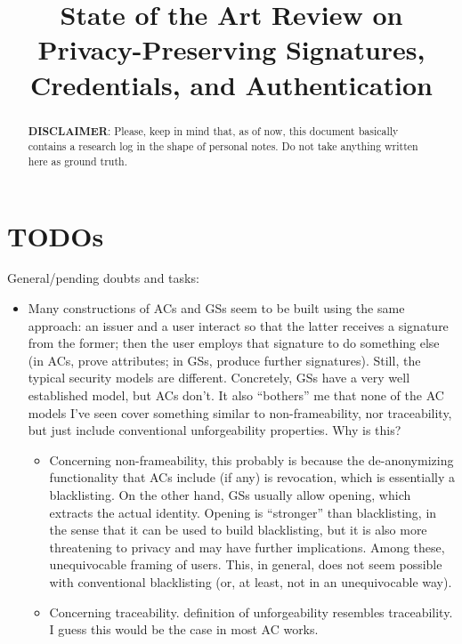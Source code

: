 \documentclass{llncs}%
\title{State of the Art Review on Privacy-Preserving Signatures, Credentials, and Authentication}
\author{}
\begin{document}
\maketitle


\begin{abstract}
	\textbf{DISCLAIMER}: Please, keep in mind that, as of now, this document
	basically contains a research log in the shape of personal notes. Do not take 
	anything written here as ground truth.
\end{abstract}










\section{TODOs}

General/pending doubts and tasks:

\begin{itemize}
\item Many constructions of ACs and GSs seem to be built using the same
  approach: an issuer and a user interact so that the latter receives a signature
  from the former; then the user employs that signature to do something else (in
  ACs, prove attributes; in GSs, produce further signatures). Still, the typical
  security models are different. Concretely, GSs have a very well established
  model, but ACs don't. It also ``bothers'' me that none of the AC models I've
  seen cover something similar to non-frameability, nor traceability, but just
  include conventional unforgeability properties. Why is this?
  \begin{itemize}
  \item Concerning non-frameability, this probably is because the de-anonymizing
    functionality that ACs include (if any) is revocation, which is essentially
    a blacklisting. On the other hand, GSs usually allow opening, which extracts
    the actual identity. Opening is ``stronger'' than blacklisting, in the sense
    that it can be used to build blacklisting, but it is also more threatening
    to privacy and may have further implications. Among these, unequivocable
    framing of users. This, in general, does not seem possible with conventional
    blacklisting (or, at least, not in an unequivocable way).
  \item Concerning traceability. \cite{fhs19} definition of unforgeability
    resembles traceability. I guess this would be the case in most AC works.
  \end{itemize}
\end{itemize}



\end{document}
